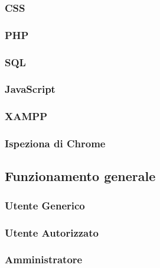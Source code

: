 \documentclass[a4paper]{article}
\begin{document}
			\subsubsection{CSS}
								
			\subsubsection{PHP}
				
			\newpage
			\subsubsection{SQL}
				
			\subsubsection{JavaScript}
				
			\subsubsection{XAMPP}
				
			\subsubsection{Ispeziona di Chrome}
				
		\subsection{Funzionamento generale}
			
			\subsubsection{Utente Generico}
				
			\subsubsection{Utente Autorizzato}
				
			\subsubsection{Amministratore}
				
\end{document}
